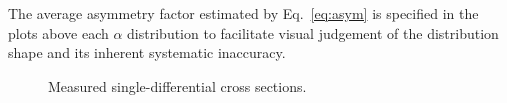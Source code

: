 The average asymmetry factor estimated by Eq.~\eqref{eq:asym} is specified in the plots above each $\alpha$ distribution to facilitate visual judgement of the distribution shape and its inherent systematic inaccuracy.

\begin{figure}[htp]
\begin{center}
\caption{\small Measured single-differential cross sections.} \label{fig:appx_1}
\end{center}
\end{figure}

